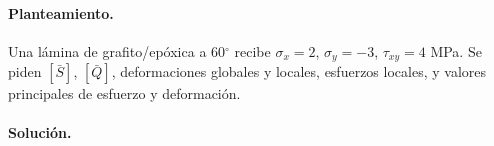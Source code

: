 \documentclass[11pt]{article}
\begin{document}
\paragraph{Planteamiento.} Una lámina de grafito/epóxica a 60\ensuremath{^\circ} recibe $\sigma_x=2$, $\sigma_y=-3$, $\tau_{xy}=4$ MPa. Se piden $[\bar S]$, $[\bar Q]$, deformaciones globales y locales, esfuerzos locales, y valores principales de esfuerzo y deformación.

\paragraph{Solución.}
\begin{center}\end{center}
\end{document}
